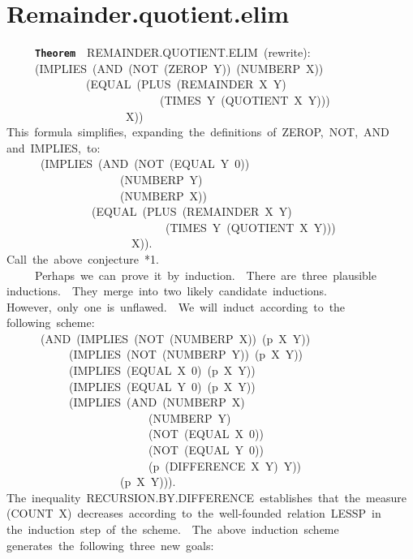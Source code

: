 \documentclass[11pt]{book}
\newenvironment{pubasis}{\begin{flushleft}\ttfamily\small}{\normalsize\rmfamily\end{flushleft}}
\newcommand{\axiomordefinition}[1]{\vspace{6pt}\texttt{\textbf{#1}}}
\newcommand{\pubdefaulttextsize}{\large}
\begin{document}
\section{Remainder.quotient.elim}
\pubdefaulttextsize
\begin{pubasis}
~~~~~\axiomordefinition{Theorem}~~REMAINDER.QUOTIENT.ELIM~(rewrite):\\
~~~~~(IMPLIES~(AND~(NOT~(ZEROP~Y))~(NUMBERP~X))\\
~~~~~~~~~~~~~~(EQUAL~(PLUS~(REMAINDER~X~Y)\\
~~~~~~~~~~~~~~~~~~~~~~~~~~~(TIMES~Y~(QUOTIENT~X~Y)))\\
~~~~~~~~~~~~~~~~~~~~~X))\\

This~formula~simplifies,~expanding~the~definitions~of~ZEROP,~NOT,~AND\\
and~IMPLIES,~to:\\

~~~~~~(IMPLIES~(AND~(NOT~(EQUAL~Y~0))\\
~~~~~~~~~~~~~~~~~~~~(NUMBERP~Y)\\
~~~~~~~~~~~~~~~~~~~~(NUMBERP~X))\\
~~~~~~~~~~~~~~~(EQUAL~(PLUS~(REMAINDER~X~Y)\\
~~~~~~~~~~~~~~~~~~~~~~~~~~~~(TIMES~Y~(QUOTIENT~X~Y)))\\
~~~~~~~~~~~~~~~~~~~~~~X)).\\

Call~the~above~conjecture~*1.\\

~~~~~Perhaps~we~can~prove~it~by~induction.~~There~are~three~plausible\\
inductions.~~They~merge~into~two~likely~candidate~inductions.\\
However,~only~one~is~unflawed.~~We~will~induct~according~to~the\\
following~scheme:\\
~~~~~~(AND~(IMPLIES~(NOT~(NUMBERP~X))~(p~X~Y))\\
~~~~~~~~~~~(IMPLIES~(NOT~(NUMBERP~Y))~(p~X~Y))\\
~~~~~~~~~~~(IMPLIES~(EQUAL~X~0)~(p~X~Y))\\
~~~~~~~~~~~(IMPLIES~(EQUAL~Y~0)~(p~X~Y))\\
~~~~~~~~~~~(IMPLIES~(AND~(NUMBERP~X)\\
~~~~~~~~~~~~~~~~~~~~~~~~~(NUMBERP~Y)\\
~~~~~~~~~~~~~~~~~~~~~~~~~(NOT~(EQUAL~X~0))\\
~~~~~~~~~~~~~~~~~~~~~~~~~(NOT~(EQUAL~Y~0))\\
~~~~~~~~~~~~~~~~~~~~~~~~~(p~(DIFFERENCE~X~Y)~Y))\\
~~~~~~~~~~~~~~~~~~~~(p~X~Y))).\\
The~inequality~RECURSION.BY.DIF\-FER\-ENCE~establishes~that~the~measure\\
(COUNT~X)~decreases~according~to~the~well-founded~relation~LESSP~in\\
the~induction~step~of~the~scheme.~~The~above~induction~scheme\\
generates~the~following~three~new~goals:\\


\end{pubasis}
\end{document}
